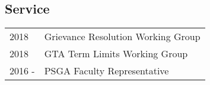 \documentclass[margin,line,pifont,palatino,courier]{res}
\begin{document}
\begin{resume}











\section{\sc Service}

\begin{tabular}{@{}p{0.8in}p{4in}}
  2018 & Grievance Resolution Working Group \\
  2018 & GTA Term Limits Working Group\\
  2016 - & PSGA Faculty Representative\\
\end{tabular}


\end{resume}
\end{document}
